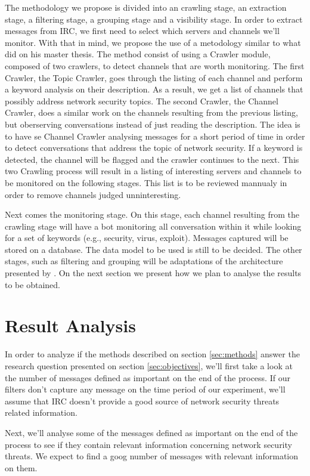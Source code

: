 \documentclass[12pt]{article}
\begin{document}
The methodology we propose is divided into an crawling stage, an extraction
stage, a filtering stage, a grouping stage and a visibility stage.
In order to extract messages from IRC, we first need to select which servers
and channels we'll monitor. With that in mind, we propose the use of a
metodology similar to what \cite{michels2013} did on his master
thesis. The method consist of using a Crawler module, composed of two crawlers,
to detect channels that are worth monitoring.
%
The first Crawler, the Topic Crawler, goes through the listing of each channel
and perform a keyword analysis on their description. As a result, we get a list
of channels that possibly address network security topics.
%
The second Crawler, the Channel Crawler, does a similar work on the channels
resulting from the previous listing, but oberserving conversations instead of
just reading the description. The idea is to have se Channel Crawler analysing
messages for a short period of time in order to detect conversations that
address the topic of network security. If a keyword is detected, the channel
will be flagged and the crawler continues to the next.
%
This two Crawling process will result in a listing of interesting
servers and channels to be monitored on the following stages. This list
is to be reviewed mannualy in order to remove channels judged unninteresting.

Next comes the monitoring stage. On this stage, each channel resulting from the
crawling stage will have a bot monitoring all conversation within it while
looking for a set of keywords (e.g., security, virus, exploit). Messages
captured will be stored on a database. The data model to be used is still
to be decided.
The other stages, such as filtering and grouping will be adaptations of the
architecture presented by \cite{campiolo2013}. On the next section we present
how we plan to analyse the results to be obtained.

\section{Result Analysis} \label{sec:result}

In order to analyze if the methods described on section \ref{sec:methods}
answer the research question presented on section \ref{sec:objectives}, we'll
first take a look at the number of messages defined as important on the end of
the process.
%
If our filters don't capture any message on the time period of our experiment,
we'll assume that IRC doesn't provide a good source of network security threats
related information.

Next, we'll analyse some of the messages defined as important on the end of the
process to see if they contain relevant information concerning network security
threats.
%
We expect to find a goog number of messages with relevant information on them.



\end{document}

